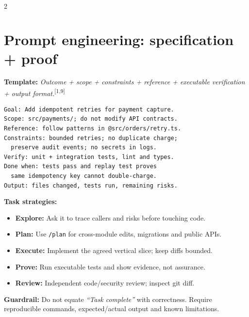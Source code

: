 \documentclass[9pt,a4paper]{extarticle}
\newcommand{\kw}[1]{\textbf{\color{navy}#1}}
\newcommand{\cmd}[1]{{\footnotesize\color{navy}\texttt{#1}}}
\newcommand{\src}[1]{\textsuperscript{\color{blue}[#1]}}
\newcommand{\warn}[1]{\par\textbf{\color{amber}Guardrail:} #1\par}
\begin{document}
\begin{multicols}{2}
\section{Prompt engineering: specification + proof}
\kw{Template:} \emph{Outcome + scope + constraints + reference + executable verification + output format.}\src{1,9}
\begin{lstlisting}
Goal: Add idempotent retries for payment capture.
Scope: src/payments/; do not modify API contracts.
Reference: follow patterns in @src/orders/retry.ts.
Constraints: bounded retries; no duplicate charge;
  preserve audit events; no secrets in logs.
Verify: unit + integration tests, lint and types.
Done when: tests pass and replay test proves
  same idempotency key cannot double-charge.
Output: files changed, tests run, remaining risks.
\end{lstlisting}
\kw{Task strategies:}
\begin{itemize}
\item \textbf{Explore:} Ask it to trace callers and risks before touching code.
\item \textbf{Plan:} Use \cmd{/plan} for cross-module edits, migrations and public APIs.
\item \textbf{Execute:} Implement the agreed vertical slice; keep diffs bounded.
\item \textbf{Prove:} Run executable tests and show evidence, not assurance.
\item \textbf{Review:} Independent code/security review; inspect git diff.
\end{itemize}
\warn{Do not equate \emph{``Task complete''} with correctness. Require reproducible commands, expected/actual output and known limitations.}


\end{multicols}
\end{document}
